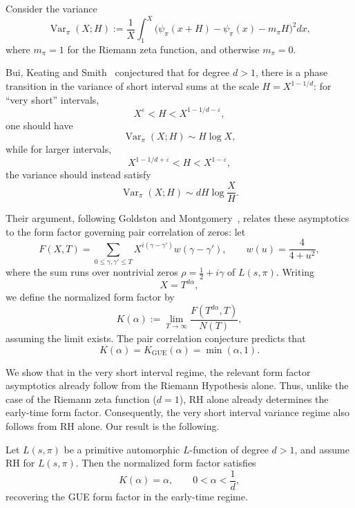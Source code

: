 \documentclass[12pt]{amsart}
\begin{document}
Consider the variance
\[
\operatorname{Var}_\pi(X;H)
:=
\frac1X \int_1^X \bigl( \psi_\pi(x+H)-\psi_\pi(x)-m_\pi H \bigr)^2dx,
\]
where $m_\pi=1$   for the Riemann zeta function, and otherwise
$m_\pi=0$. 

  Bui, Keating and Smith~\cite{BKS} conjectured that for   degree $d>1$, there is a phase transition in the
variance of short interval sums at the scale $H=X^{1-1/d}$: for
``very short'' intervals,
\[
X^\varepsilon < H < X^{1-1/d-\varepsilon},
\]
one should have
\[
\operatorname{Var}_\pi(X;H)\sim H\log X,
\]
while for larger intervals,
\[
X^{1-1/d+\varepsilon}<H<X^{1-\varepsilon},
\]
the variance should instead satisfy
\[
\operatorname{Var}_\pi(X;H)\sim dH\log \frac{X}{H}.
\]

Their argument, following Goldston and Montgomery~\cite{GM},
relates these asymptotics to the form factor governing pair
correlation of zeros: 
let 
\[
F(X,T)=
\sum_{0\leq \gamma,\gamma'\leq T}
X^{i(\gamma-\gamma')}w(\gamma-\gamma'),
\qquad
w(u)=\frac{4}{4+u^2},
\]
where the sum runs over nontrivial zeros $\rho=\tfrac 12+i\gamma$ of $L(s,\pi)$.  
Writing
\[
X=T^{d\alpha},
\]
 we define the normalized form factor by
\[
K(\alpha)
:=
\lim_{T\to\infty}
\frac{F(T^{d\alpha},T)}{N(T)},
\]
assuming the limit exists. 
The pair correlation conjecture predicts that
\[
K(\alpha)=K_{\mathrm{GUE}}(\alpha)=\min(\alpha,1).
\]


 

 We show that in the very short interval regime, the relevant form
factor asymptotics already follow from the Riemann Hypothesis alone.
Thus, unlike the case of the Riemann zeta function ($d=1$),
RH alone already determines the early-time form factor. 
Consequently, the very short interval variance regime also follows from RH alone.
Our result is the following.

\begin{thm}\label{thm2}
Let $L(s,\pi)$ be a primitive automorphic $L$-function of degree
$d>1$, and assume RH for $L(s,\pi)$. Then the normalized form
factor satisfies
\[
K(\alpha)=\alpha,
\qquad
0<\alpha<\frac1d,
\]
recovering the GUE form factor in the early-time regime.
\end{thm}
%
 
\end{document}
